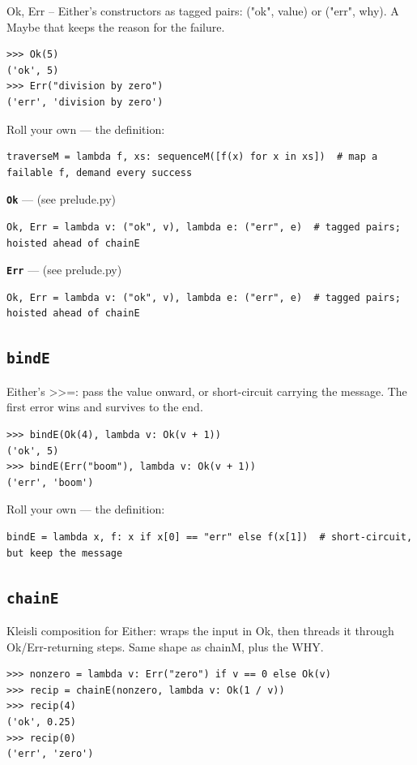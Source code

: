 \documentclass[10pt,letterpaper]{book}
\begin{document}
Ok, Err -- Either's constructors as tagged pairs: ("ok", value) or ("err", why). A Maybe that keeps the reason for the failure.

\begin{lstlisting}[style=ex]
>>> Ok(5)
('ok', 5)
>>> Err("division by zero")
('err', 'division by zero')
\end{lstlisting}

Roll your own --- the definition:

\begin{lstlisting}[style=ex]
traverseM = lambda f, xs: sequenceM([f(x) for x in xs])  # map a failable f, demand every success
\end{lstlisting}

\textbf{\texttt{Ok}}\label{def:Ok} --- (see prelude.py)

\begin{lstlisting}[style=ex]
Ok, Err = lambda v: ("ok", v), lambda e: ("err", e)  # tagged pairs; hoisted ahead of chainE
\end{lstlisting}
\textbf{\texttt{Err}}\label{def:Err} --- (see prelude.py)

\begin{lstlisting}[style=ex]
Ok, Err = lambda v: ("ok", v), lambda e: ("err", e)  # tagged pairs; hoisted ahead of chainE
\end{lstlisting}
\subsection{\texttt{bindE}}\label{def:bindE}
Either's >>=: pass the value onward, or short-circuit carrying the message. The first error wins and survives to the end.
\begin{lstlisting}[style=ex]
>>> bindE(Ok(4), lambda v: Ok(v + 1))
('ok', 5)
>>> bindE(Err("boom"), lambda v: Ok(v + 1))
('err', 'boom')
\end{lstlisting}

Roll your own --- the definition:

\begin{lstlisting}[style=ex]
bindE = lambda x, f: x if x[0] == "err" else f(x[1])  # short-circuit, but keep the message
\end{lstlisting}
\subsection{\texttt{chainE}}\label{def:chainE}
Kleisli composition for Either: wraps the input in Ok, then threads it through Ok/Err-returning steps. Same shape as chainM, plus the WHY.
\begin{lstlisting}[style=ex]
>>> nonzero = lambda v: Err("zero") if v == 0 else Ok(v)
>>> recip = chainE(nonzero, lambda v: Ok(1 / v))
>>> recip(4)
('ok', 0.25)
>>> recip(0)
('err', 'zero')
\end{lstlisting}
\end{document}
